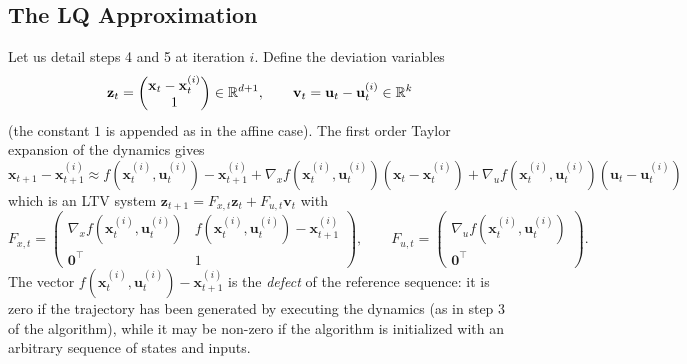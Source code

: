 \documentclass[10pt, a4paper]{report}
\begin{document}
\subsection{The LQ Approximation}
Let us detail steps 4 and 5 at iteration $i$. Define the deviation variables\begin{equation}
    \mathbf z_t=\begin{pmatrix}\mathbf x_t-\mathbf x_t^{(i)}\\ 1\end{pmatrix}\in{\mathbb R}^{d+1},\qquad \mathbf v_t=\mathbf u_t-\mathbf u_t^{(i)}\in{\mathbb R}^k
\end{equation}
(the constant $1$ is appended as in the affine case). The first order Taylor expansion of the dynamics gives\begin{equation}
    \mathbf x_{t+1}-\mathbf x_{t+1}^{(i)}\approx f(\mathbf x_t^{(i)},\mathbf u_t^{(i)})-\mathbf x_{t+1}^{(i)}+\nabla_xf(\mathbf x_t^{(i)},\mathbf u_t^{(i)})(\mathbf x_t-\mathbf x_t^{(i)})+\nabla_uf(\mathbf x_t^{(i)},\mathbf u_t^{(i)})(\mathbf u_t-\mathbf u_t^{(i)})
\end{equation}
which is an LTV system $\mathbf z_{t+1}=F_{x,t}\mathbf z_t+F_{u,t}\mathbf v_t$ with\begin{equation}
    F_{x,t}=\begin{pmatrix}
        \nabla_xf(\mathbf x_t^{(i)},\mathbf u_t^{(i)}) & f(\mathbf x_t^{(i)},\mathbf u_t^{(i)})-\mathbf x_{t+1}^{(i)}\\
        \mathbf 0^\top & 1
    \end{pmatrix},\qquad 
    F_{u,t}=\begin{pmatrix}
        \nabla_uf(\mathbf x_t^{(i)},\mathbf u_t^{(i)})\\ \mathbf 0^\top
    \end{pmatrix}.
\end{equation}
The vector $f(\mathbf x_t^{(i)},\mathbf u_t^{(i)})-\mathbf x_{t+1}^{(i)}$ is the \textit{defect} of the reference sequence: it is zero if the trajectory has been generated by executing the dynamics (as in step 3 of the algorithm), while it may be non-zero if the algorithm is initialized with an arbitrary sequence of states and inputs.
\end{document}
